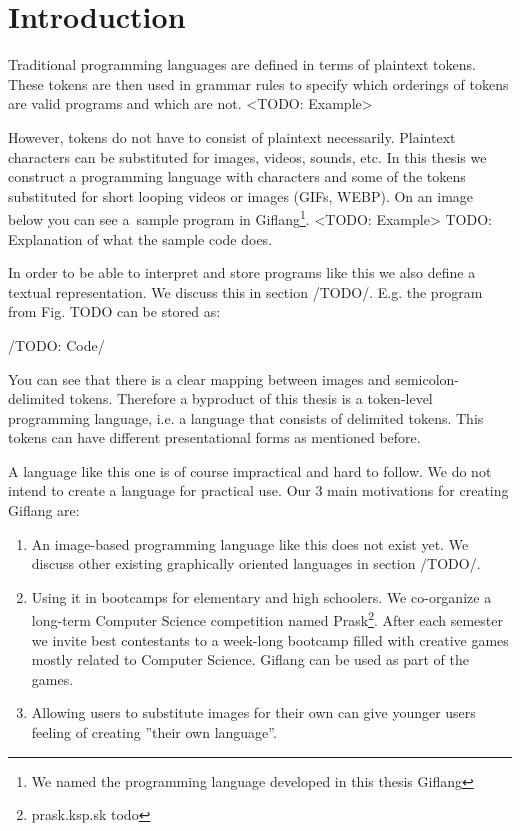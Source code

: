 \chapter{Introduction}

Traditional programming languages are defined in terms of plaintext tokens. These tokens
are then used in grammar rules to specify which orderings of tokens are valid programs and
which are not.
<TODO: Example>

However, tokens do not have to consist of plaintext necessarily. Plaintext characters can be substituted for
images, videos, sounds, etc. In this thesis we construct a programming language with characters and some
of the tokens substituted for short looping videos or images (GIFs, WEBP). On an image below you can see a~sample
program in Giflang\footnote{We named the programming language developed in this thesis Giflang}.
<TODO: Example>
TODO: Explanation of what the sample code does.

In order to be able to interpret and store programs like this we also define a textual representation. We discuss
this in section /TODO/. E.g. the program from Fig. TODO can be stored as:

/TODO: Code/

You can see that there is a clear mapping between images and semicolon-delimited tokens. Therefore a byproduct of
this thesis is a token-level programming language, i.e. a language that consists of delimited tokens. This tokens
can have different presentational forms as mentioned before.

A language like this one is of course impractical and hard to follow. We do not intend to create a language
for practical use. Our $3$ main motivations for creating Giflang are:
\begin{enumerate}
\item An image-based programming language like this does not exist yet. We discuss other existing graphically oriented
languages in section /TODO/. 
\item Using it in bootcamps for elementary and high schoolers. We co-organize a long-term Computer Science competition
named Prask\footnote{prask.ksp.sk todo}. After each semester we invite best contestants to a week-long bootcamp
filled with creative games mostly related to Computer Science. Giflang can be used as part of the games.
\item Allowing users to substitute images for their own can give younger users feeling of creating ''their own language''.
\end{enumerate}

